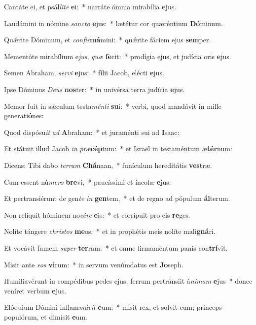 \item Cantáte ei, et psál\textit{li}\textit{te} \textbf{e}i:~* narráte ómnia mirabília \textbf{e}jus.
\item Laudámini in nómine \textit{sanc}\textit{to} \textbf{e}jus:~* lætétur cor quæréntium \textbf{Dó}minum.
\item Quǽrite Dóminum, et \textit{con}\textit{fir}\textbf{má}mini:~* quǽrite fáciem ejus \textbf{sem}per.
\item Mementóte mirabílium e\textit{jus}, \textit{quæ} \textbf{fe}cit:~* prodígia ejus, et judícia oris \textbf{e}jus.
\item Semen Abraham, \textit{ser}\textit{vi} \textbf{e}jus:~* fílii Jacob, elécti \textbf{e}jus.
\item Ipse Dóminus \textit{De}\textit{us} \textbf{nos}ter:~* in univérsa terra judícia \textbf{e}jus.
\item Memor fuit in sǽculum testa\textit{mén}\textit{ti} \textbf{su}i:~* verbi, quod mandávit in mille generati\textbf{ó}nes:
\item Quod dispósu\textit{it} \textit{ad} \textbf{A}braham:~* et juraménti sui ad \textbf{I}saac:
\item Et státuit illud Jacob \textit{in} \textit{præ}\textbf{cép}tum:~* et Israël in testaméntum æ\textbf{tér}num:
\item Dicens: Tibi dabo \textit{ter}\textit{ram} \textbf{Chá}naan,~* funículum hereditátis \textbf{ves}træ.
\item Cum essent nú\textit{me}\textit{ro} \textbf{bre}vi,~* paucíssimi et íncolæ \textbf{e}jus:
\item Et pertransiérunt de gen\textit{te} \textit{in} \textbf{gen}tem,~* et de regno ad pópulum \textbf{ál}terum.
\item Non relíquit hóminem no\textit{cé}\textit{re} \textbf{e}is:~* et corrípuit pro eis \textbf{re}ges.
\item Nolíte tángere \textit{chris}\textit{tos} \textbf{me}os:~* et in prophétis meis nolíte mali\textbf{gná}ri.
\item Et vocávit famem \textit{su}\textit{per} \textbf{ter}ram:~* et omne firmaméntum panis con\textbf{trí}vit.
\item Misit ante \textit{e}\textit{os} \textbf{vi}rum:~* in servum venúmdatus est \textbf{Jo}seph.
\item Humiliavérunt in compédibus pedes ejus, ferrum pertránsiit á\textit{ni}\textit{mam} \textbf{e}jus~* donec veníret verbum \textbf{e}jus.
\item Elóquium Dómini inflam\textit{má}\textit{vit} \textbf{e}um:~* misit rex, et solvit eum; princeps populórum, et dimísit \textbf{e}um.
